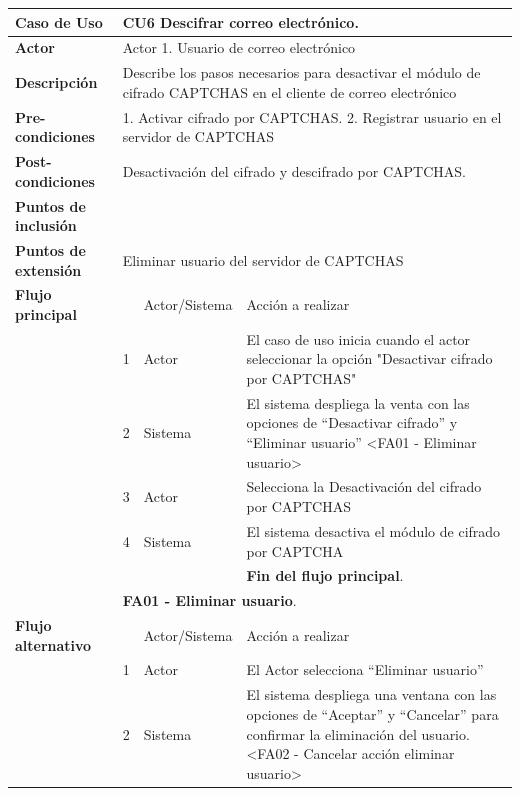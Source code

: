 \begin{longtable}[H]{| p{} | p{} |p{4cm}|p{5cm}|}
     \hline
     \textbf{Caso de Uso} &\multicolumn{3}{|l|}{CU6 Descifrar correo electrónico.}\\
     \hline
     \textbf{Actor} & \multicolumn{3}{|l|}{Actor 1. Usuario de correo electrónico}\\
     \hline
     \textbf{Descripción} & \multicolumn{3}{|p{10cm}|}{Describe los pasos necesarios para desactivar el módulo de cifrado CAPTCHAS en el cliente de correo electrónico}\\
     \hline
     \textbf{Pre-condiciones} & \multicolumn{3}{|p{10cm}|}{1. Activar cifrado por CAPTCHAS. 2. Registrar usuario en el servidor de CAPTCHAS}\\
     \hline
     \textbf{Post-condiciones} & \multicolumn{3}{|l|}{Desactivación del cifrado y descifrado por CAPTCHAS.}\\
     \hline
     \textbf{Puntos de inclusión} & \multicolumn{3}{|l|}{}\\
     \hline
     \textbf{Puntos de extensión} & \multicolumn{3}{|l|}{Eliminar usuario del servidor de CAPTCHAS}\\
     \hline
     \textbf{Flujo principal} & & Actor/Sistema & Acción a realizar\\
     \hline
     & 1 & Actor & El caso de uso inicia cuando el actor seleccionar la opción "Desactivar cifrado por CAPTCHAS"\\
     \hline
     & 2 & Sistema & El sistema despliega la venta con las opciones de ``Desactivar cifrado'' y ``Eliminar usuario'' <FA01 - Eliminar usuario>\\
     \hline
     & 3 & Actor & Selecciona la Desactivación del cifrado por CAPTCHAS\\
     \hline
     & 4 & Sistema & El sistema desactiva el módulo de cifrado por CAPTCHA\\
     \hline
     & & & \textbf{Fin del flujo principal}.\\
     \hline
    & \multicolumn{3}{|l|}{\textbf{FA01 - Eliminar usuario}.}\\
    \hline
    \textbf{Flujo alternativo} & & Actor/Sistema & Acción a realizar\\
    \hline
    & 1 & Actor & El Actor selecciona ``Eliminar usuario''\\
    \hline
    & 2 & Sistema & El sistema despliega una ventana con las opciones de ``Aceptar'' y ``Cancelar'' para confirmar la eliminación del usuario. <FA02 - Cancelar acción eliminar usuario>\\

\end{longtable}
